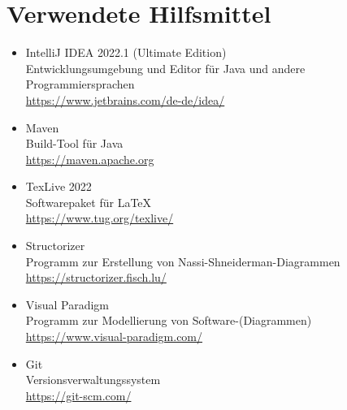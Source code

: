 \chapter{Verwendete Hilfsmittel}\label{ch:verwendete-hilfsmittel}

\begin{itemize}
    \item IntelliJ IDEA 2022.1 (Ultimate Edition)\\ Entwicklungsumgebung und Editor für Java und andere Programmiersprachen \\\url{https://www.jetbrains.com/de-de/idea/}
    \item Maven\\Build-Tool für Java\\\url{https://maven.apache.org}
    \item TexLive 2022\\Softwarepaket für \LaTeX\\\url{https://www.tug.org/texlive/}
    \item Structorizer\\Programm zur Erstellung von Nassi-Shneiderman-Diagrammen \\\url{https://structorizer.fisch.lu/}
    \item Visual Paradigm\\Programm zur Modellierung von Software-(Diagrammen) \\\url{https://www.visual-paradigm.com/}
    \item Git\\Versionsverwaltungssystem \\\url{https://git-scm.com/}
\end{itemize}